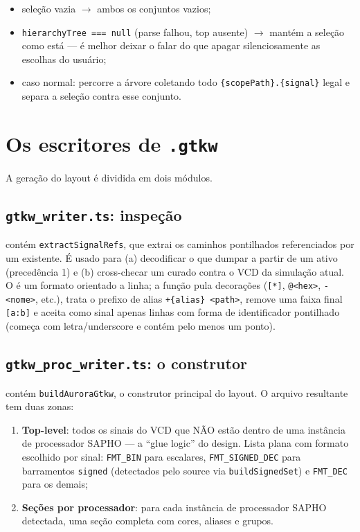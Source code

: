\begin{itemize}[leftmargin=*]
  \item seleção vazia $\rightarrow$ ambos os conjuntos vazios;
  \item \lstinline|hierarchyTree === null| (parse falhou, top ausente)
    $\rightarrow$ mantém a seleção como está --- é melhor deixar o
     falar do que apagar silenciosamente as escolhas do usuário;
  \item caso normal: percorre a árvore coletando todo
    \lstinline|{scopePath}.{signal}| legal e separa a seleção contra esse
    conjunto.
\end{itemize}

\section{Os escritores de \texttt{.gtkw}}

A geração do layout  é dividida em dois módulos.

\subsection{\texttt{gtkw\_writer.ts}: inspeção}

 contém \lstinline|extractSignalRefs|, que extrai
os caminhos pontilhados referenciados por um  existente. É usado
para (a) decodificar o que dumpar a partir de um  ativo
(precedência 1) e (b) cross-checar um  curado contra o VCD da
simulação atual. O  é um formato orientado a linha; a função pula
decorações (\lstinline|[*]|, \lstinline|@<hex>|, \lstinline|-<nome>|, etc.),
trata o prefixo de alias \lstinline|+{alias} <path>|, remove uma faixa final
\lstinline|[a:b]| e aceita como sinal apenas linhas com forma de identificador
pontilhado (começa com letra/underscore e contém pelo menos um ponto).

\subsection{\texttt{gtkw\_proc\_writer.ts}: o construtor}

 contém \lstinline|buildAuroraGtkw|, o
construtor principal do layout. O arquivo resultante tem duas zonas:

\begin{enumerate}[leftmargin=*]
  \item \textbf{Top-level}: todos os sinais do VCD que NÃO estão dentro de uma
    instância de processador SAPHO --- a \enquote{glue logic} do design. Lista
    plana com formato escolhido por sinal: \lstinline|FMT_BIN| para escalares,
    \lstinline|FMT_SIGNED_DEC| para barramentos \lstinline|signed| (detectados
    pelo source via \lstinline|buildSignedSet|) e \lstinline|FMT_DEC| para os
    demais;
  \item \textbf{Seções por processador}: para cada instância de processador
    SAPHO detectada, uma seção completa com cores, aliases e grupos.
\end{enumerate}

